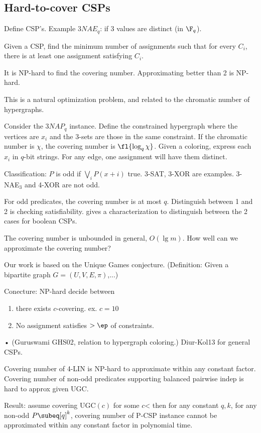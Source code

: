 \subsection{Hard-to-cover CSPs}

Define CSP's. Example $3NAE_q$: if 3 values are distinct (in $\F_q$).

Given a CSP, find the minimum number of assignments such that for every $C_i$, there is at least one assignment satisfying $C_i$.

It is NP-hard to find the covering number. Approximating better than 2 is NP-hard.

This is a natural optimization problem, and related to the chromatic number of hypergraphs.

Consider the $3NAP_q$ instance. Define the constrained hypergraph where the vertices are $x_i$ and the 3-sets are those in the same constraint. 
If the chromatic number is $\chi$, the covering number is $\fl{\log_q \chi}$.
Given a coloring, express each $x_i$ in $q$-bit strings. For any edge, one assignment will have them distinct.

Classification:
$P$ is odd if $\bigvee_i P(x+i)$ true. 3-SAT, 3-XOR are examples. 3-NAE${}_3$ and 4-XOR are not odd.

For odd predicates,  the covering number is at most $q$. Distinguish between 1 and 2 is checking satisfiability.  gives a characterization to distinguish between the 2 cases for boolean CSPs.

The covering number is unbounded in general, $O(\lg m)$. How well can we approximate the covering number?

Our work is based on the Unique Games conjecture. (Definition: Given a bipartite graph $G=(U,V,E,\pi)$,...)

Conecture: NP-hard decide between 
\begin{enumerate}
\item
there exists $c$-covering. ex. $c=10$
\item 
No assignment satisfies $>\ep$ of constraints.
\end{enumerate}•
(Guruswami GHS02, relation to hypergraph coloring.) Diur-Kol13 for general CSPs.

Covering number of 4-LIN is NP-hard to approximate within any constant factor.
Covering number of non-odd predicates supporting balanced pairwise indep is hard to approx given UGC.

Result: assume covering UGC$(c)$ for some $c$< then for any constant $q,k$, for any non-odd $P\subeq [q]^k$, covering number of P-CSP instance cannot be approximated within any constant factor in polynomial time.

